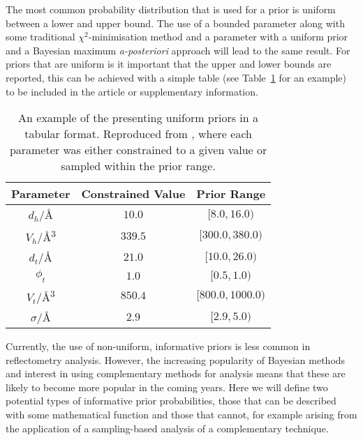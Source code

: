 \documentclass[reprint,superscriptaddress,aps,amsmath,linenumbers]{revtex4-2}
\begin{document}
The most common probability distribution that is used for a prior is uniform between a lower and upper bound.
The use of a bounded parameter along with some traditional $\chi^2$-minimisation method and a parameter with a uniform prior and a Bayesian maximum \emph{a-posteriori} approach will lead to the same result. 
For priors that are uniform is it important that the upper and lower bounds are reported, this can be achieved with a simple table  (see Table~\ref{tab:bounds} for an example) to be included in the article or supplementary information. 
%
\begin{table}
    \caption{An example of the presenting uniform priors in a tabular format. Reproduced from \cite{mccluskey_general_2020}, where each parameter was either constrained to a given value or sampled within the prior range.}
    \label{tab:bounds}
    \begin{tabular}{c| c | c}
        Parameter & Constrained Value & Prior Range \\ 
        \hline
        $d_h$/\si{\angstrom} & $10.0$ & $[8.0, 16.0)$\\
        $V_h$/\si{\angstrom^3} & $339.5$ & $[300.0, 380.0)$\\
        $d_t$/\si{\angstrom} & $21.0$ & $[10.0, 26.0)$\\
        $\phi_t$ & $1.0$ & $[0.5, 1.0)$\\
        $V_t$/\si{\angstrom^3} & $850.4$ & $[800.0, 1000.0)$\\
        $\sigma$/\si{\angstrom} & $2.9$ & $[2.9, 5.0)$\\
    \end{tabular}
\end{table}
%

Currently, the use of non-uniform, informative priors is less common in reflectometry analysis.
However, the increasing popularity of Bayesian methods and interest in using complementary methods for analysis means that these are likely to become more popular in the coming years. 
Here we will define two potential types of informative prior probabilities, those that can be described with some mathematical function and those that cannot, for example arising from the application of a sampling-based analysis of a complementary technique. 
\end{document}
